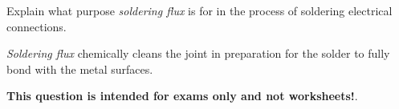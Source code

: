 

Explain what purpose {\it soldering flux} is for in the process of soldering electrical connections.







{\it Soldering flux} chemically cleans the joint in preparation for the solder to fully bond with the metal surfaces.







{\bf This question is intended for exams only and not worksheets!}.



